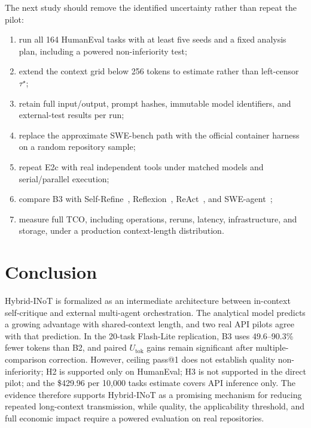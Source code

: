 The next study should remove the identified uncertainty rather than repeat the pilot:
\begin{enumerate}
\item run all 164 HumanEval tasks with at least five seeds and a fixed analysis plan, including a powered non-inferiority test;
\item extend the context grid below 256 tokens to estimate rather than left-censor $\tau^\star$;
\item retain full input/output, prompt hashes, immutable model identifiers, and external-test results per run;
\item replace the approximate SWE-bench path with the official container harness on a random repository sample;
\item repeat E2c with real independent tools under matched models and serial/parallel execution;
\item compare B3 with Self-Refine~\cite{madaan2023selfrefine}, Reflexion~\cite{shinn2023reflexion}, ReAct~\cite{yao2022react}, and SWE-agent~\cite{yang2024sweagent};
\item measure full TCO, including operations, reruns, latency, infrastructure, and storage, under a production context-length distribution.
\end{enumerate}

\section{Conclusion}

Hybrid-INoT is formalized as an intermediate architecture between in-context self-critique and external multi-agent orchestration. The analytical model predicts a growing advantage with shared-context length, and two real API pilots agree with that prediction. In the 20-task Flash-Lite replication, B3 uses 49.6--90.3\% fewer tokens than B2, and paired $U_{\mathrm{tok}}$ gains remain significant after multiple-comparison correction. However, ceiling pass@1 does not establish quality non-inferiority; H2 is supported only on HumanEval; H3 is not supported in the direct pilot; and the \$429.96 per 10,000 tasks estimate covers API inference only. The evidence therefore supports Hybrid-INoT as a promising mechanism for reducing repeated long-context transmission, while quality, the applicability threshold, and full economic impact require a powered evaluation on real repositories.

